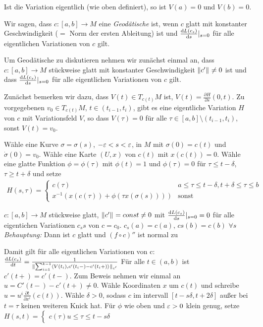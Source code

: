 \documentclass{skript}
\begin{document}
Ist die Variation eigentlich (wie oben definiert), so ist $V(a) = 0$ und $V(b) =
0$.

Wir sagen, dass $c:[a,b]\to M$ eine \emph{Geodätische} ist, wenn $c$ glatt mit
konstanter Geschwindigkeit ($=$ Norm der ersten Ableitung) ist und
$\frac{\mathrm d L(c_s)}{\mathrm d s}\vert_{s=0}$ für alle eigentlichen Variationen von $c$
gilt.

Um Geodätische zu diskutieren nehmen wir zunächst einmal an, dass $c:[a,b]\to M$
stückweise glatt mit konstanter Geschwindigkeit $\norm{c'}\neq 0$ ist und dass
$\frac{\mathrm d L(c_s)}{\mathrm d s}\vert_{s=0}$ für alle eigentlichen Variationen von $c$
gilt.

Zunächst bemerken wir dazu, dass $V(t)\in T_{c(t)}M$ ist, $V(t) =
\frac{\partial H}{\partial s}(0,t)$. Zu vorgegebenen $v_0\in T_{c(t)}M$, $t\in
(t_{i-1},t_i)$, gibt es eine eigentliche Variation $H$ von $c$ mit
Variationsfeld $V$, so dass $V(\tau) = 0$ für alle $\tau\in[a,b]\setminus
(t_{i-1},t_i)$, sonst $V(t) = v_0$.


Wähle eine Kurve $\sigma = \sigma(s)$, $-\varepsilon<s<\varepsilon$, in $M$ mit $\sigma(0) =
c(t)$ und $\dot\sigma(0) = v_0$. Wähle eine Karte $(U,x)$ von $c(t)$ mit
$x(c(t))=0$. Wähle eine glatte Funktion $\phi=\phi(\tau)$ mit $\phi(t) = 1$ und
$\phi(\tau) = 0$ für $\tau \le t- \delta$, $\tau \ge t + \delta$ und setze
\begin{align*}
  H(s,\tau) = \begin{cases}
    c(\tau) & a \le \tau \le t- \delta, t+\delta\le\tau\le b \\
    x^{-1}(x(c(\tau)) + \phi(\tau x(\sigma(s)))) & \text{sonst}
  \end{cases}
\end{align*}


$c:[a,b] \to M$ stückweise glatt, $\norm{c'}=const\neq0$ mit $
\frac{\mathrm d L(c_s)}{\mathrm d s}\vert_{s=0}=0$ für alle eigentichen Variationen $c_ss$ von
$c=c_0$.
$c_s(a)=c(a)$, $cs(b)=c(b)$ $\forall s$
\emph{Behauptung:} Dann ist $c$ glatt und $(f\circ c)''$ ist normal zu

Damit gilt für alle eigentlichen Variationen von c:
$\frac{\d L(c_s)}{\d t} =
\frac{1}{\norm[c']{\sum_{i=1}^{k-1}\sprod{V(t_i),c'(t_i-)-c'(t_i+)}}}$ Für alle
$t \in (a,b)$ ist $c'(t+) = c'(t-)$. Zum Beweis nehmen wir einmal an $u =
C'(t-)-c'(t+)\neq 0$.  Wähle Koordinaten $x$ um $c(t)$ und schreibe $u=u^i
\frac{\partial t}{\partial x^i}(c(t))$. Wähle $\delta>0$, sodass $c$ im
intervall $[t-s\delta,t+2\delta]$ außer bei $t=\tau$ keinen weiteren Knick hat.
Für $\phi$ wie oben und $\varepsilon>0$ klein genug, setze $H(s,t)=\begin{cases}c(\tau)
  u\leq\tau\leq t-s\delta \end{cases}$
\end{document}

